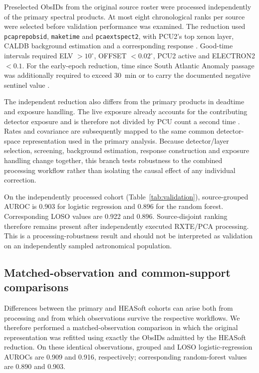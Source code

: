 \documentclass[final,5p,authoryear,nopreprintline]{elsarticle}
\begin{document}
Preselected ObsIDs from the original source roster were processed independently of the primary spectral products. At most eight chronological ranks per source were selected before validation performance was examined. The reduction used \texttt{pcaprepobsid}, \texttt{maketime} and \texttt{pcaextspect2}, with PCU2's top xenon layer, CALDB background estimation and a corresponding response \citep{NASAPCAext}. Good-time intervals required ELV $>10^\circ$, OFFSET $<0.02^\circ$, PCU2 active and ELECTRON2 $<0.1$. For the early-epoch reduction, time since South Atlantic Anomaly passage was additionally required to exceed 30~min or to carry the documented negative sentinel value \citep{NASAScreening}.

The independent reduction also differs from the primary products in deadtime and exposure handling. The live exposure already accounts for the contributing detector exposure and is therefore not divided by PCU count a second time \citep{NASAPCAext}. Rates and covariance are subsequently mapped to the same common detector-space representation used in the primary analysis. Because detector/layer selection, screening, background estimation, response construction and exposure handling change together, this branch tests robustness to the combined processing workflow rather than isolating the causal effect of any individual correction.

On the independently processed cohort (Table~\ref{tab:validation}), source-grouped AUROC is 0.903 for logistic regression and 0.896 for the random forest. Corresponding LOSO values are 0.922 and 0.896. Source-disjoint ranking therefore remains present after independently executed RXTE/PCA processing. This is a processing-robustness result and should not be interpreted as validation on an independently sampled astronomical population.

\subsection{Matched-observation and common-support comparisons}

Differences between the primary and HEASoft cohorts can arise both from processing and from which observations survive the respective workflows. We therefore performed a matched-observation comparison in which the original representation was refitted using exactly the ObsIDs admitted by the HEASoft reduction. On these identical observations, grouped and LOSO logistic-regression AUROCs are 0.909 and 0.916, respectively; corresponding random-forest values are 0.890 and 0.903.
\end{document}
